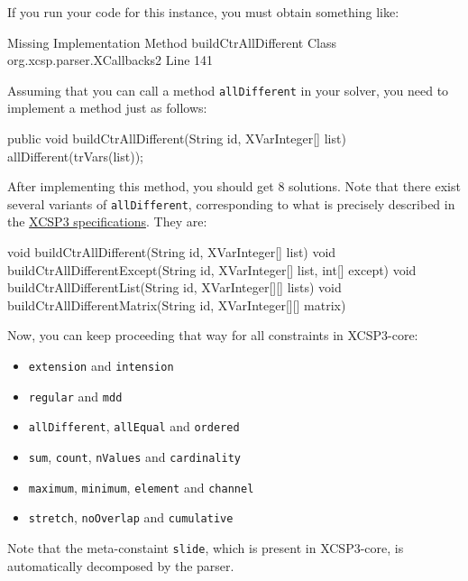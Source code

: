 \documentclass[10pt]{article}
\newenvironment{boxabsc}
               {\medskip \begin{bclogo}[barre=none,arrondi=0.2,logo=]{}\vspace{-0.6cm}}
               {\vspace{-0.1cm}\end{bclogo} \smallskip}
\newcommand{\gb}[1]{{\tt #1}} %
\newcommand{\nn}[1]{{\tt #1}} %
\begin{document}
If you run your code for this instance, you must obtain something like:

\begin{boxabsc}
\begin{void}
Missing Implementation
  Method buildCtrAllDifferent
  Class org.xcsp.parser.XCallbacks2
  Line 141
\end{void} 
\end{boxabsc}

Assuming that you can call a method \nn{allDifferent} in your solver, you need to implement a method just as follows:
\begin{boxabsc}
\begin{absc}
public void buildCtrAllDifferent(String id, XVarInteger[] list) {
  allDifferent(trVars(list));
}
\end{absc} 
\end{boxabsc}

After implementing this method, you should get 8 solutions.
Note that there exist several variants of \gb{allDifferent}, corresponding to what is precisely described in the \href{http://xcsp.org/specifications}{XCSP3 specifications}. They are:
\begin{boxabsc}
\begin{absc}
void buildCtrAllDifferent(String id, XVarInteger[] list)
void buildCtrAllDifferentExcept(String id, XVarInteger[] list, int[] except)
void buildCtrAllDifferentList(String id, XVarInteger[][] lists)
void buildCtrAllDifferentMatrix(String id, XVarInteger[][] matrix)
\end{absc} 
\end{boxabsc}

Now, you can keep proceeding that way for all constraints in XCSP3-core:
\begin{itemize}
\item \gb{extension} and \gb{intension}
\item \gb{regular} and \gb{mdd}
\item \gb{allDifferent}, \gb{allEqual} and \gb{ordered}
\item \gb{sum}, \gb{count}, \gb{nValues} and \gb{cardinality}
\item \gb{maximum}, \gb{minimum}, \gb{element} and \gb{channel}
\item \gb{stretch}, \gb{noOverlap} and \gb{cumulative}
\end{itemize}

Note that the meta-constaint \gb{slide}, which is present in XCSP3-core, is automatically decomposed by the parser.
\end{document}
